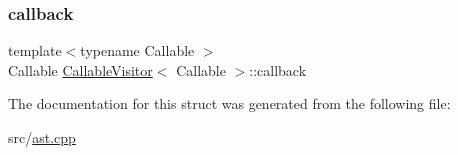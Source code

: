 \subsubsection{\texorpdfstring{callback}{callback}}
{\footnotesize\ttfamily template$<$typename Callable $>$ \\
Callable \hyperlink{struct_callable_visitor}{Callable\+Visitor}$<$ Callable $>$\+::callback}



The documentation for this struct was generated from the following file\+:\begin{DoxyCompactItemize}
\item 
src/\hyperlink{ast_8cpp}{ast.\+cpp}\end{DoxyCompactItemize}
